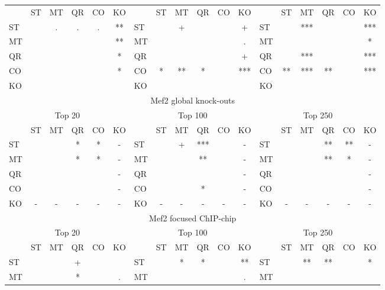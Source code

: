 \documentclass{article}
\begin{document}
\begin{longtable}[c]{lccccc|lccccc|lccccc}
    & ST  & MT  & QR  & CO  & KO &     & ST  & MT  & QR  & CO  & KO  &     & ST  & MT  & QR  & CO  & KO \\
ST &     & .   & .   & .   & **  & ST &     & +   &     &     & +   & ST &     & *** &     &     & ***\\
MT &     &     &     &     & **  & MT &     &     &     &     & .   & MT &     &     &     &     & *  \\
QR &     &     &     &     & *   & QR &     &     &     &     & +   & QR &     & *** &     &     & ***\\
CO &     &     &     &     & *   & CO & *   & **  & *   &     & *** & CO & **  & *** & **  &     & ***\\
KO &     &     &     &     &     & KO &     &     &     &     &     & KO &     &     &     &     &    \\
\multicolumn{18}{c}{Mef2 global knock-outs} \\
\multicolumn{6}{c|}{Top 20} &\multicolumn{6}{c|}{Top 100}  & \multicolumn{6}{c}{Top 250}\\
    & ST  & MT  & QR  & CO  & KO &     & ST  & MT  & QR  & CO  & KO  &     & ST  & MT  & QR  & CO  & KO \\
ST &     &     & *   & *   & -   & ST &     & +   & *** &     & -   & ST &     &     & **  & **  & -  \\
MT &     &     & *   & *   & -   & MT &     &     & **  &     & -   & MT &     &     & **  & *   & -  \\
QR &     &     &     &     & -   & QR &     &     &     &     & -   & QR &     &     &     &     & -  \\
CO &     &     &     &     & -   & CO &     &     & *   &     & -   & CO &     &     &     &     & -  \\
KO & -   & -   & -   & -   & -   & KO & -   & -   & -   & -   & -   & KO & -   & -   & -   & -   & -  \\
\multicolumn{18}{c}{Mef2 focused ChIP-chip} \\
\multicolumn{6}{c|}{Top 20} &\multicolumn{6}{c|}{Top 100}  & \multicolumn{6}{c}{Top 250}\\
    & ST  & MT  & QR  & CO  & KO &     & ST  & MT  & QR  & CO  & KO  &     & ST  & MT  & QR  & CO  & KO \\
ST &     &     & +   &     &     & ST &     & *   & *   &     & **  & ST &     & **  & **  &     & *  \\
MT &     &     & *   &     & .   & MT &     &     &     &     & .   & MT &     &     &     &     &    \\

\end{longtable}
\end{document}
